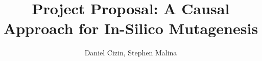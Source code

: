 \documentclass[12pt]{article}
\title{%
\textbf{Project Proposal: A Causal Approach for In-Silico Mutagenesis}
}
\author{Daniel Cizin, Stephen Malina}
\begin{document}
\maketitle
\bigskip

\clearpage
\glsresetall{}



\nocite{*}

\clearpage




\clearpage
\appendix

%
\end{document}
